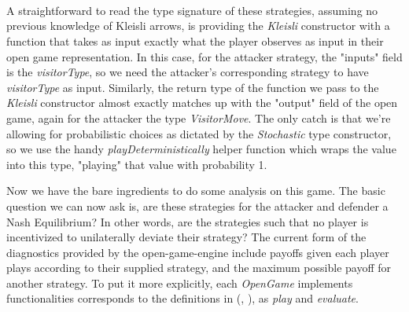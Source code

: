 \begin{hscode}\SaveRestoreHook
	\>[B]{}\mathbin{::}\;\;\;\<[E]%
	\\
	\>[B]{}\mathrel{=}\mathbin{\$}\mathbin{\$}\;\<[E]%
	\\[\blanklineskip]%
	\>[B]{}\mathbin{::}\;\;\;\<[E]%
	\\
	\>[B]{}\mathrel{=}\mathbin{\$}\mathbin{\$}\;\<[E]%
	\ColumnHook
\end{hscode}\resethooks

A straightforward to read the type signature of these strategies, assuming no previous knowledge of Kleisli arrows, is providing the \textit{Kleisli} constructor with a function that takes as input exactly what the player observes as input in their open game representation. In this case, for the attacker strategy, the "inputs" field is the \textit{visitorType}, so we need the attacker's corresponding strategy to have \textit{visitorType} as input. Similarly, the return type of the function we pass to the \textit{Kleisli} constructor almost exactly matches up with the "output" field of the open game, again for the attacker the type \textit{VisitorMove}. The only catch is that we're allowing for probabilistic choices as dictated by the \textit{Stochastic} type constructor, so we use the handy \textit{playDeterministically} helper function which wraps the value into this type, "playing" that value with probability 1. 

Now we have the bare ingredients to do some analysis on this game. The basic question we can now ask is, are these strategies for the attacker and defender a Nash Equilibrium? In other words, are the strategies such that no player is incentivized to unilaterally deviate their strategy? The current form of the diagnostics provided by the open-game-engine include payoffs given each player plays according to their supplied strategy, and the maximum possible payoff for another strategy. To put it more explicitly, each \textit{OpenGame} implements functionalities corresponds to the definitions in (\cite{HedgesThesis}, \cite{BayesianOpenGames}), as \textit{play} and \textit{evaluate}. 


